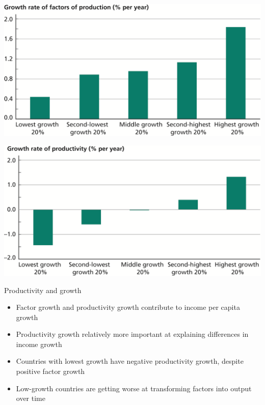 \documentclass[10pt]{beamer}
\begin{document}
\begin{frame}[label={sec:orgee37c83}]{}
\begin{center}
\includegraphics[width=.75\textwidth]{./img/7.5.png}
\end{center}
\end{frame}

\begin{frame}[label={sec:org81b6af0}]{}
\begin{center}
\includegraphics[width=.75\textwidth]{./img/7.6.png}
\end{center}
\end{frame}

\begin{frame}[label={sec:org1b7c909}]{}
\alert{Productivity and growth}
\begin{itemize}
\item Factor growth and productivity growth contribute to income per capita growth
\item Productivity growth relatively more important at explaining differences in income growth
\item Countries with lowest growth have negative productivity growth, despite positive factor growth
\item Low-growth countries are getting \alert{worse} at transforming factors into output over time
\end{itemize}
\end{frame}
\end{document}
